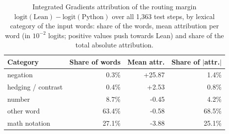 \begin{table}[ht]
\centering
\small
\begin{tabular}{lrrr}
\hline
\textbf{Category} & \textbf{Share of words} & \textbf{Mean attr.} & \textbf{Share of $|$attr.$|$} \\
\hline
negation & 0.3\% & +25.87 & 1.4\% \\
hedging / contrast & 0.4\% & +2.53 & 0.8\% \\
number & 8.7\% & -0.45 & 4.2\% \\
other word & 63.4\% & -0.58 & 68.5\% \\
math notation & 27.1\% & -3.88 & 25.1\% \\
\hline
\end{tabular}
\caption{Integrated Gradients attribution of the routing margin $\mathrm{logit}(\mathrm{Lean})-\mathrm{logit}(\mathrm{Python})$ over all 1,363 test steps, by lexical category of the input words: share of the words, mean attribution per word (in $10^{-2}$ logits; positive values push towards Lean) and share of the total absolute attribution.}
\label{tab:ig_categories}
\end{table}
